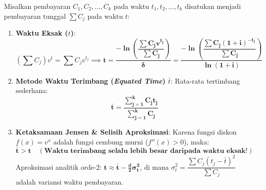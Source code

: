 \documentclass[10pt,a4paper]{article}
\begin{document}
\begin{teoremabox}
Misalkan pembayaran $C_1, C_2, \dots, C_k$ pada waktu $t_1, t_2, \dots, t_k$ disatukan menjadi pembayaran tunggal $\sum C_j$ pada waktu $t$:
\begin{enumerate}[leftmargin=1.5em, topsep=1.5pt, itemsep=2.5pt]
    \item \textbf{Waktu Eksak ($t$)}:
    \begin{equation*}
        \left(\sum C_j\right) v^t = \sum C_j v^{t_j} \implies \mathbf{t = \frac{-\ln\left( \dfrac{\sum C_j v^{t_j}}{\sum C_j} \right)}{\delta} = \frac{-\ln\left( \dfrac{\sum C_j (1+i)^{-t_j}}{\sum C_j} \right)}{\ln(1+i)}}
    \end{equation*}
    \item \textbf{Metode Waktu Terimbang (\textit{Equated Time}) $\bar{t}$}: Rata-rata tertimbang sederhana:
    \begin{equation*}
        \mathbf{\bar{t} = \frac{\sum_{j=1}^k C_j t_j}{\sum_{j=1}^k C_j}}
    \end{equation*}
    \item \textbf{Ketaksamaan Jensen \& Selisih Aproksimasi}: Karena fungsi diskon $f(x) = v^x$ adalah fungsi cembung murni ($f''(x) > 0$), maka:
    \begin{equation*}
        \mathbf{\bar{t} > t \quad (\text{Waktu terimbang selalu lebih besar daripada waktu eksak!})}
    \end{equation*}
    Aproksimasi analitik orde-2: $\mathbf{t \approx \bar{t} - \frac{d}{2} \sigma_t^2}$, di mana $\sigma_t^2 = \dfrac{\sum C_j (t_j - \bar{t})^2}{\sum C_j}$ adalah variansi waktu pembayaran.
\end{enumerate}
\end{teoremabox}
\end{document}
